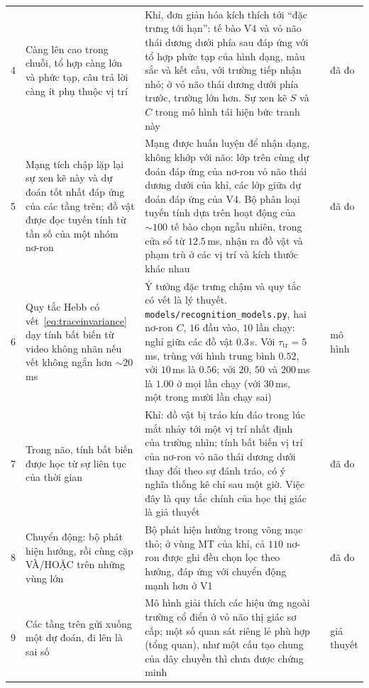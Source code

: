 {\begin{longtable}{>{\raggedright}p{0.5cm}>{\raggedright}p{4.0cm}>{\raggedright}p{5.6cm}>{\raggedright}p{2.3cm}>{\raggedright\arraybackslash}p{1.7cm}}
4 & Càng lên cao trong chuỗi, tổ hợp càng lớn và phức tạp, câu trả lời càng ít phụ thuộc vị trí & Khỉ, đơn giản hóa kích thích tới ``đặc trưng tới hạn'': tế bào V4 và vỏ não thái dương dưới phía sau đáp ứng với tổ hợp phức tạp của hình dạng, màu sắc và kết cấu, với trường tiếp nhận nhỏ; ở vỏ não thái dương dưới phía trước, trường lớn hơn. Sự xen kẽ $S$ và $C$ trong mô hình tái hiện bức tranh này & \cite{KobatakeTanaka1994,Riesenhuber1999} & đã đo \\
5 & Mạng tích chập lặp lại sự xen kẽ này và dự đoán tốt nhất đáp ứng của các tầng trên; đồ vật được đọc tuyến tính từ tần số của một nhóm nơ-ron & Mạng được huấn luyện để nhận dạng, không khớp với não: lớp trên cùng dự đoán đáp ứng của nơ-ron vỏ não thái dương dưới của khỉ, các lớp giữa dự đoán đáp ứng của V4. Bộ phân loại tuyến tính dựa trên hoạt động của $\sim100$ tế bào chọn ngẫu nhiên, trong cửa sổ từ $12.5$\,ms, nhận ra đồ vật và phạm trù ở các vị trí và kích thước khác nhau & \cite{Fukushima1980,Yamins2014,Hung2005} & đã đo \\
6 & Quy tắc Hebb có vết~\eqref{eq:traceinvariance} dạy tính bất biến từ video không nhãn nếu vết không ngắn hơn $\sim20$\,ms & Ý tưởng đặc trưng chậm và quy tắc có vết là lý thuyết. \texttt{models/\allowbreak recognition\_models.py}, hai nơ-ron $C$, $16$ đầu vào, $10$ lần chạy: nghỉ giữa các đồ vật $0.3$\,s. Với $\tau_{\text{tr}}=5$\,ms, trùng với hình trung bình $0.52$, với $10$\,ms là $0.56$; với $20$, $50$ và $200$\,ms là $1.00$ ở mọi lần chạy (với $30$\,ms, một trong mười lần chạy sai) & \cite{Foldiak1991,WiskottSejnowski2002} & mô hình \\
7 & Trong não, tính bất biến được học từ sự liên tục của thời gian & Khỉ: đồ vật bị tráo kín đáo trong lúc mắt nhảy tới một vị trí nhất định của trường nhìn; tính bất biến vị trí của nơ-ron vỏ não thái dương dưới thay đổi theo sự đánh tráo, có ý nghĩa thống kê chỉ sau một giờ. Việc đây là quy tắc chính của học thị giác là giả thuyết & \cite{LiDiCarlo2008} & đã đo \\
8 & Chuyển động: bộ phát hiện hướng, rồi cùng cặp VÀ/HOẶC trên những vùng lớn & Bộ phát hiện hướng trong võng mạc thỏ; ở vùng MT của khỉ, cả $110$ nơ-ron được ghi đều chọn lọc theo hướng, đáp ứng với chuyển động mạnh hơn ở V1 & \cite{Barlow1965,Albright1984} & đã đo \\
9 & Các tầng trên gửi xuống một dự đoán, đi lên là sai số & Mô hình giải thích các hiệu ứng ngoài trường cổ điển ở vỏ não thị giác sơ cấp; một số quan sát riêng lẻ phù hợp (tổng quan), như một cấu tạo chung của dây chuyền thì chưa được chứng minh & \cite{RaoBallard1999,Keller2018} & giả thuyết \\

\end{longtable}}
